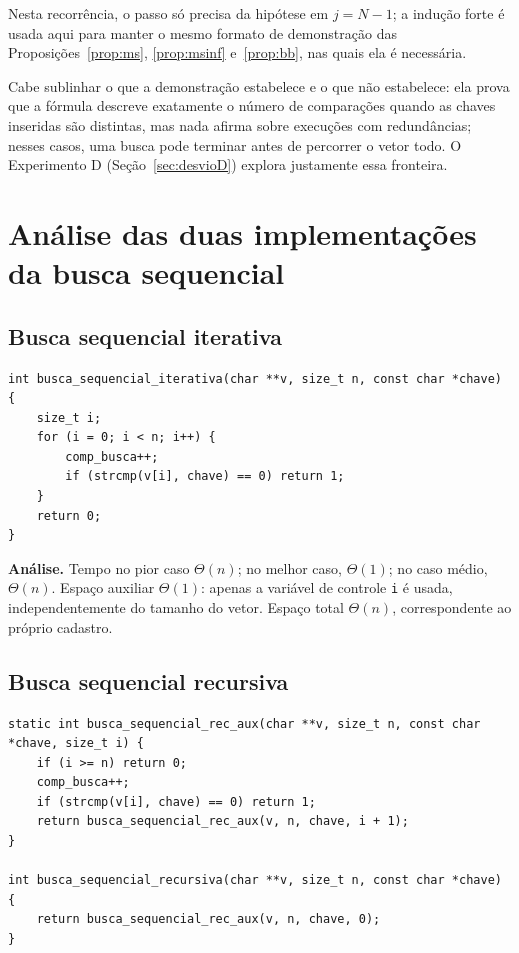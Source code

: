 \documentclass[11pt,a4paper]{article}
\begin{document}
Nesta recorrência, o passo só precisa da hipótese em $j=N-1$; a indução forte é usada aqui para manter o mesmo formato de demonstração das Proposições~\ref{prop:ms}, \ref{prop:msinf} e~\ref{prop:bb}, nas quais ela é necessária.

Cabe sublinhar o que a demonstração estabelece e o que não estabelece: ela prova que a fórmula descreve exatamente o número de comparações quando as chaves inseridas são distintas, mas nada afirma sobre execuções com redundâncias; nesses casos, uma busca pode terminar antes de percorrer o vetor todo. O Experimento D (Seção~\ref{sec:desvioD}) explora justamente essa fronteira.

\section{Análise das duas implementações da busca sequencial}

\subsection{Busca sequencial iterativa}

\begin{lstlisting}[caption={Busca sequencial iterativa}]
int busca_sequencial_iterativa(char **v, size_t n, const char *chave) {
    size_t i;
    for (i = 0; i < n; i++) {
        comp_busca++;
        if (strcmp(v[i], chave) == 0) return 1;
    }
    return 0;
}
\end{lstlisting}

\textbf{Análise.} Tempo no pior caso $\Theta(n)$; no melhor caso, $\Theta(1)$; no caso médio, $\Theta(n)$. Espaço auxiliar $\Theta(1)$: apenas a variável de controle \texttt{i} é usada, independentemente do tamanho do vetor. Espaço total $\Theta(n)$, correspondente ao próprio cadastro.

\subsection{Busca sequencial recursiva}

\begin{lstlisting}[caption={Busca sequencial recursiva}]
static int busca_sequencial_rec_aux(char **v, size_t n, const char *chave, size_t i) {
    if (i >= n) return 0;
    comp_busca++;
    if (strcmp(v[i], chave) == 0) return 1;
    return busca_sequencial_rec_aux(v, n, chave, i + 1);
}

int busca_sequencial_recursiva(char **v, size_t n, const char *chave) {
    return busca_sequencial_rec_aux(v, n, chave, 0);
}
\end{lstlisting}
\end{document}
